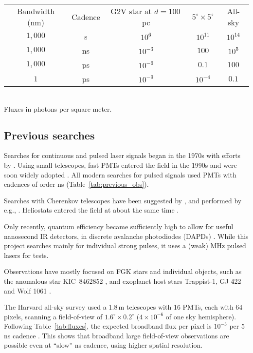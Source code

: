\documentclass[twocolumn,tighten,longauthor]{myaastex62}
\begin{document}
\begin{table*}
\center
\caption{Comparison of observation choices}
\label{tab:fluxes}
\begin{tabular}{ccccc}
\hline
Bandwidth (nm) & Cadence & G2V star at $d=100\,$pc & $5^{\circ}\times5^{\circ}$ & All-sky \\
$1{,}000$ & s  & $10^6$    & $10^{11}$ & $10^{14}$ \\
$1{,}000$ & ns & $10^{-3}$ & $100$     & $10^{5}$  \\
$1{,}000$ & ps & $10^{-6}$ & $0.1$     & $100$     \\
$1$       & ps & $10^{-9}$ & $10^{-4}$ & $0.1$     \\
\hline
\end{tabular}
\\Fluxes in photons per square meter.
\end{table*}


\subsection{Previous searches}
\label{sub:previous_searches}
Searches for continuous and pulsed laser signals began in the 1970s with efforts by \citet{1977SoSAO..19....5S,1997Ap&SS.252...51B}. Using small telescopes, fast PMTs entered the field in the 1990s \citep{1993SPIE.1867..178K,1995ASPC...74..387K} and were soon widely adopted \citep[e.g.,][]{2004IAUS..213..415W,2005AsBio...5..604S}. All modern searches for pulsed signals used PMTs with cadences of order ns (Table~\ref{tab:previous_obs}).

Searches with Cherenkov telescopes have been suggested by \citet{2001AsBio...1..489E,2005ICRC....5..387H}, and performed by e.g., \citet{2016ApJ...818L..33A}. Heliostats entered the field at about the same time \citep{1996APh.....5..353O,2009AsBio...9..345H}.

Only recently, quantum efficiency became sufficiently high to allow for useful nanosecond IR detectors, in discrete avalanche photodiodes (DAPDs) \citep{2014SPIE.9147E..0JW,2014SPIE.9147E..4KM,2016SPIE.9908E..10M}. While this project searches mainly for individual strong pulses, it uses a (weak) MHz pulsed lasers for tests.

Observations have mostly focused on FGK stars and individual objects, such as the anomalous star KIC~8462852 \citep{2016ApJ...825L...5S,2016ApJ...818L..33A}, and exoplanet host stars Trappist-1, GJ 422 and Wolf 1061 \citep{2018AAS...23110401W}.

The Harvard all-sky survey used a 1.8\,m telescopes with 16 PMTs, each with 64 pixels, scanning a field-of-view of $1.6^{\circ}\times0.2^{\circ}$ ($4\times10^{-6}$ of one sky hemisphere). Following Table~\ref{tab:fluxes}, the expected broadband flux per pixel is $10^{-3}$ per 5\,ns cadence \citet{2013PhDT.......161M}. This shows that broadband large field-of-view observations are possible even at ``slow'' ns cadence, using higher spatial resolution.
\end{document}
